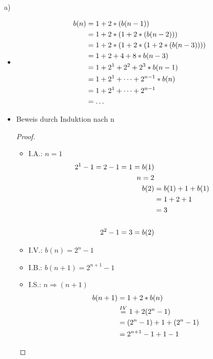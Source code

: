 \begin{itemize}{a)}
\begin{itemize}
 			\item	
 			\begin{equation}
 				\begin{aligned}
 					b(n) &= 1 + 2*(b(n-1)) \\
 						 &= 1 + 2*(1+2*(b(n-2))) \\
 						 &= 1 + 2*(1+2*(1+2*(b(n-3)))) \\
 						 &= 1 + 2 + 4 + 8 * b(n-3) \\
 						 &= 1 +2^1 + 2^2 + 2^3 * b(n-1) \notag \\
 						 &= 1 + 2^1 + \dots + 2^{n-1}*b(n) \\
 						 &= 1 + 2^1 + \dots + 2^{n-1} \\
 						 &= \dots
 				\end{aligned}
 			\end{equation}
 			\item Beweis durch Induktion nach n \\
 			\begin{proof}
 				\begin{itemize}
 					\item I.A.: $n = 1$\\
 						\begin{equation}
 							\begin{aligned}
 								2^1-1 = 2-1 = 1 = b(1) \\
 								n=2 \\
 								b(2) &= b(1) + 1 + b(1) \\
 									 &= 1 + 2+1 \notag \\
 									 &= 3 \\
 								\\
 								2^2-1 = 3 = b(2)
 							\end{aligned}
 						\end{equation}
 					\item I.V.: $ b(n) = 2^n-1$ 
 					\item I.B.: $b(n+1) = 2^{n+1}-1$
 					\item I.S.: $ n \Rightarrow (n+1)$ \\
 						\begin{equation}
 							\begin{aligned}
 								b(n+1) &= 1 + 2*b(n) \\
 									   &\overset{IV}{=} 1 + 2(2^n-1) \\
 									   &=(2^n-1)+1+(2^n-1) \notag \\
 									   &= 2^{n+1}-1+1-1 \\

\end{aligned}
\end{equation}
\end{itemize}
\end{proof}
\end{itemize}
\end{itemize}
